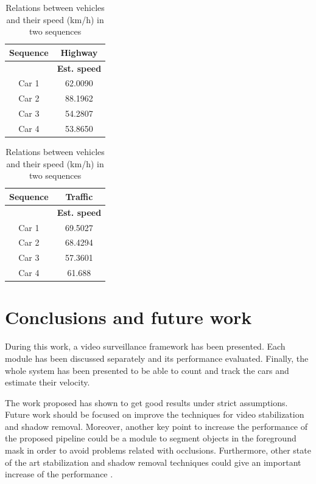 \documentclass{article}
\begin{document}
\begin{table}
\caption{Relations between vehicles and their speed (km/h) in two sequences}
\begin{center}
\begin{tabular}{c c}
Sequence & \textbf{Highway} \\
\hline
& \textbf{Est. speed}\\
Car 1 & 62.0090\\
Car 2 & 88.1962\\
Car 3 & 54.2807\\
Car 4 & 53.8650\\
\end{tabular}
\quad
\begin{tabular}{c c}
Sequence & \textbf{Traffic}\\
\hline
& \textbf{Est. speed}\\
Car 1 & 69.5027\\
Car 2 & 68.4294\\
Car 3 & 57.3601\\
Car 4 & 61.688\\
\end{tabular}
\end{center}
\label{t:speedest}
\end{table}



\section{Conclusions and future work}
\label{sec:conclusions}

During this work, a video surveillance framework has been presented. Each module has been discussed separately and its performance evaluated. Finally, the whole system has been presented to be able to count and track the cars and estimate their velocity.

The work proposed has shown to get good results under strict assumptions. Future work should be focused on improve the techniques for video stabilization and shadow removal. Moreover, another key point to increase the performance of the proposed pipeline could be a module to segment objects in the foreground mask in order to avoid problems related with occlusions. Furthermore, other state of the art stabilization and shadow removal techniques could give an important increase of the performance \cite{kopf2014first}.




\end{document}
